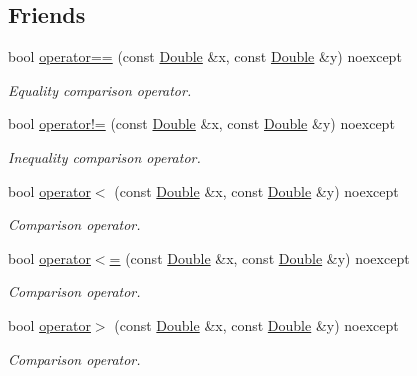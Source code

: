 \subsection*{Friends}
\begin{DoxyCompactItemize}
\item 
bool \hyperlink{class_mdt_1_1_numeric_1_1_double_ae628a01068d337ab31665a46510d501b}{operator==} (const \hyperlink{class_mdt_1_1_numeric_1_1_double}{Double} \&x, const \hyperlink{class_mdt_1_1_numeric_1_1_double}{Double} \&y) noexcept
\begin{DoxyCompactList}\small\item\em Equality comparison operator. \end{DoxyCompactList}\item 
bool \hyperlink{class_mdt_1_1_numeric_1_1_double_a9f04aacec2f90c7849a50cee30ae2653}{operator!=} (const \hyperlink{class_mdt_1_1_numeric_1_1_double}{Double} \&x, const \hyperlink{class_mdt_1_1_numeric_1_1_double}{Double} \&y) noexcept
\begin{DoxyCompactList}\small\item\em Inequality comparison operator. \end{DoxyCompactList}\item 
bool \hyperlink{class_mdt_1_1_numeric_1_1_double_a1347b811297911998b12f4c310a1d177}{operator$<$} (const \hyperlink{class_mdt_1_1_numeric_1_1_double}{Double} \&x, const \hyperlink{class_mdt_1_1_numeric_1_1_double}{Double} \&y) noexcept
\begin{DoxyCompactList}\small\item\em Comparison operator. \end{DoxyCompactList}\item 
bool \hyperlink{class_mdt_1_1_numeric_1_1_double_a9e84a7850ba8c45834563705c530e1f3}{operator$<$=} (const \hyperlink{class_mdt_1_1_numeric_1_1_double}{Double} \&x, const \hyperlink{class_mdt_1_1_numeric_1_1_double}{Double} \&y) noexcept
\begin{DoxyCompactList}\small\item\em Comparison operator. \end{DoxyCompactList}\item 
bool \hyperlink{class_mdt_1_1_numeric_1_1_double_af407120cb09028d757c0503e7fe9d31e}{operator$>$} (const \hyperlink{class_mdt_1_1_numeric_1_1_double}{Double} \&x, const \hyperlink{class_mdt_1_1_numeric_1_1_double}{Double} \&y) noexcept
\begin{DoxyCompactList}\small\item\em Comparison operator. \end{DoxyCompactList}\item 

\end{DoxyCompactItemize}
